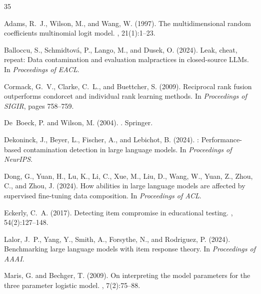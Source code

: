 \documentclass[letterpaper,11pt]{article}
\begin{document}


\begin{thebibliography}{35}

Adams, R.~J., Wilson, M., and Wang, W. (1997).
\newblock The multidimensional random coefficients multinomial logit model.
, 21(1):1--23.

Balloccu, S., Schmidtov{\'a}, P., Lango, M., and Dusek, O. (2024).
\newblock Leak, cheat, repeat: Data contamination and evaluation malpractices in closed-source {LLMs}.
\newblock In {\em Proceedings of EACL}.

Cormack, G.~V., Clarke, C.~L., and Buettcher, S. (2009).
\newblock Reciprocal rank fusion outperforms condorcet and individual rank learning methods.
\newblock In {\em Proceedings of SIGIR}, pages 758--759.

De~Boeck, P. and Wilson, M. (2004).
.
\newblock Springer.

Dekoninck, J., Beyer, L., Fischer, A., and Lebichot, B. (2024).
: Performance-based contamination detection in large language models.
\newblock In {\em Proceedings of NeurIPS}.

Dong, G., Yuan, H., Lu, K., Li, C., Xue, M., Liu, D., Wang, W., Yuan, Z., Zhou, C., and Zhou, J. (2024).
\newblock How abilities in large language models are affected by supervised fine-tuning data composition.
\newblock In {\em Proceedings of ACL}.

Eckerly, C.~A. (2017).
\newblock Detecting item compromise in educational testing.
, 54(2):127--148.

Lalor, J.~P., Yang, Y., Smith, A., Forsythe, N., and Rodriguez, P. (2024).
\newblock Benchmarking large language models with item response theory.
\newblock In {\em Proceedings of AAAI}.

Maris, G. and Bechger, T. (2009).
\newblock On interpreting the model parameters for the three parameter logistic model.
, 7(2):75--88.


\end{thebibliography}
\end{document}
